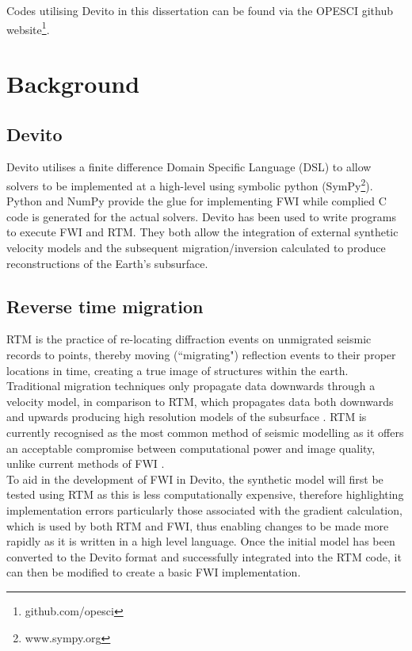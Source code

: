 Codes utilising Devito in this dissertation can be found via the OPESCI github website\footnote{github.com/opesci}. 

\section{Background}

\subsection{Devito}
Devito utilises a finite difference Domain Specific Language (DSL) to allow solvers to be implemented at a high-level using symbolic python (SymPy\footnote{www.sympy.org}). Python and NumPy provide the glue for implementing FWI while complied C code is generated for the actual solvers. Devito has been used to write programs to execute FWI and RTM. They both allow the integration of external synthetic velocity models and the subsequent migration/inversion calculated \citep{lange2016devito} to produce reconstructions of the Earth's subsurface. 

\subsection{Reverse time migration}
RTM is the practice of re-locating diffraction events on unmigrated seismic records to points, thereby moving (``migrating") reflection events to their proper locations in time, creating a true image of structures within the earth. Traditional migration techniques only propagate data downwards through a velocity model, in comparison to RTM, which propagates data both downwards and upwards producing high resolution models of the subsurface \citep{gray2001seismic}. RTM is currently recognised as the most common method of seismic modelling as it offers an acceptable compromise between computational power and image quality, unlike current methods of FWI \citep{yoon2004challenges}. \\
To aid in the development of FWI in Devito, the synthetic model will first be tested using RTM as this is less computationally expensive, therefore highlighting implementation errors particularly those associated with the gradient calculation, which is used by both RTM and FWI, thus enabling changes to be made more rapidly as it is written in a high level language. Once the initial model has been converted to the Devito format and successfully integrated into the RTM code, it can then be modified to create a basic FWI implementation. 

